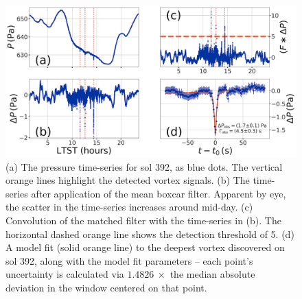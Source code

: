 \documentclass{aastex63}
\begin{document}
\begin{figure}
    \centering
    \includegraphics[width=\textwidth]{figures/data_conditioning_and_fit.png}
    \caption{(a) The pressure time-series for sol 392, as blue dots. The vertical orange lines highlight the detected vortex signals. (b) The time-series after application of the mean boxcar filter. Apparent by eye, the scatter in the time-series increases around mid-day. (c) Convolution of the matched filter with the time-series in (b). The horizontal dashed orange line shows the detection threshold of 5. (d) A model fit (solid orange line) to the deepest vortex discovered on sol 392, along with the model fit parameters -- each point's uncertainty is calculated via $1.4826\ \times$ the median absolute deviation in the window centered on that point.}
    \label{fig:data_conditioning_and_fit}
\end{figure}
\end{document}
